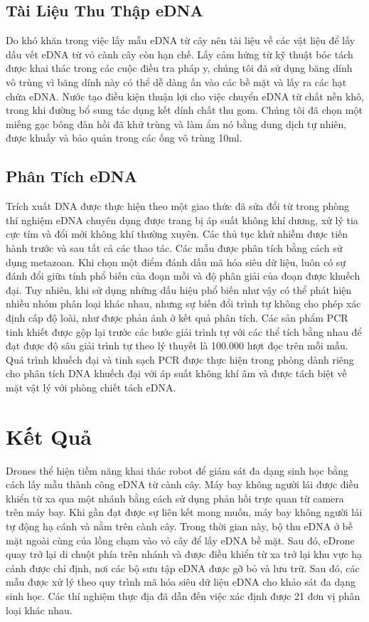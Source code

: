 \documentclass[12pt,a4paper]{article}
\begin{document}
\subsection{Tài Liệu Thu Thập eDNA}
Do khó khăn trong việc lấy mẫu eDNA từ cây nên tài liệu về các vật liệu để lấy dấu vết eDNA từ vỏ cành cây còn hạn chế. Lấy cảm hứng từ kỹ thuật bóc tách được khai thác trong các cuộc điều tra pháp y, chúng tôi đã sử dụng băng dính vô trùng vì băng dính này có thể dễ dàng ấn vào các bề mặt và lấy ra các hạt chứa eDNA. Nước tạo điều kiện thuận lợi cho việc chuyển eDNA từ chất nền khô, trong khi đường bổ sung tác dụng kết dính chất thu gom. Chúng tôi đã chọn một miếng gạc bông đàn hồi đã khử trùng và làm ẩm nó bằng dung dịch tự nhiên, được khuấy và bảo quản trong các ống vô trùng 10ml.\\
\subsection{Phân Tích eDNA}
Trích xuất DNA được thực hiện theo một giao thức đã sửa đổi từ trong phòng thí nghiệm eDNA chuyên dụng được trang bị áp suất không khí dương, xử lý tia cực tím và đổi mới không khí thường xuyên. Các thủ tục khử nhiễm được tiến hành trước và sau tất cả các thao tác. Các mẫu được phân tích bằng cách sử dụng metazoan. Khi chọn một điểm đánh dấu mã hóa siêu dữ liệu, luôn có sự đánh đổi giữa tính phổ biến của đoạn mồi và độ phân giải của đoạn được khuếch đại. Tuy nhiên, khi sử dụng những dấu hiệu phổ biến như vậy có thể phát hiện nhiều nhóm phân loại khác nhau, nhưng sự biến đổi trình tự không cho phép xác định cấp độ loài, như được phản ánh ở kết quả phân tích. Các sản phẩm PCR tinh khiết được gộp lại trước các bước giải trình tự với các thể tích bằng nhau để đạt được độ sâu giải trình tự theo lý thuyết là 100.000 lượt đọc trên mỗi mẫu. Quá trình khuếch đại và tinh sạch PCR được thực hiện trong phòng dành riêng cho phân tích DNA khuếch đại với áp suất không khí âm và được tách biệt về mặt vật lý với phòng chiết tách eDNA. \\
\section{Kết Quả}
Drones thể hiện tiềm năng khai thác robot để giám sát đa dạng sinh học bằng cách lấy mẫu thành công eDNA từ cành cây. Máy bay không người lái được điều khiển từ xa qua một nhánh bằng cách sử dụng phản hồi trực quan từ camera trên máy bay. Khi gần đạt được sự liên kết mong muốn, máy bay không người lái tự động hạ cánh và nằm trên cành cây. Trong thời gian này, bộ thu eDNA ở bề mặt ngoài cùng của lồng chạm vào vỏ cây để lấy eDNA bề mặt. Sau đó, eDrone quay trở lại di chuột phía trên nhánh và được điều khiển từ xa trở lại khu vực hạ cánh được chỉ định, nơi các bộ sưu tập eDNA được gỡ bỏ và lưu trữ. Sau đó, các mẫu được xử lý theo quy trình mã hóa siêu dữ liệu eDNA cho khảo sát đa dạng sinh học. Các thí nghiệm thực địa đã dẫn đến việc xác định được 21 đơn vị phân loại khác nhau.\\
\end{document}
